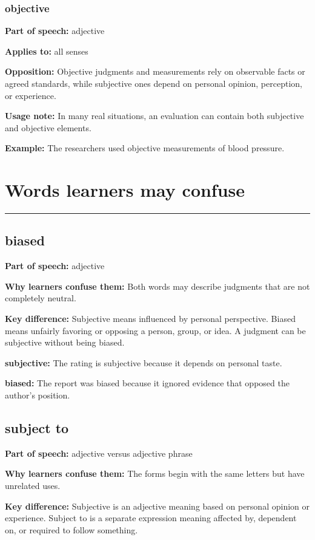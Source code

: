 \documentclass[11pt]{article}
\newcommand{\sectionrule}{\par\vspace{-0.5em}\noindent\textcolor{Accent}{\rule{\linewidth}{0.6pt}}\par}
\begin{document}
\subsubsection{objective}
\textbf{Part of speech:} adjective

\textbf{Applies to:} all senses

\textbf{Opposition:} Objective judgments and measurements rely on observable facts or agreed standards, while subjective ones depend on personal opinion, perception, or experience.

\textbf{Usage note:} In many real situations, an evaluation can contain both subjective and objective elements.

\textbf{Example:} The researchers used objective measurements of blood pressure.

\section{Words learners may confuse}
\sectionrule
\subsection{biased}
\textbf{Part of speech:} adjective

\textbf{Why learners confuse them:} Both words may describe judgments that are not completely neutral.

\textbf{Key difference:} Subjective means influenced by personal perspective. Biased means unfairly favoring or opposing a person, group, or idea. A judgment can be subjective without being biased.

\textbf{subjective:} The rating is subjective because it depends on personal taste.

\textbf{biased:} The report was biased because it ignored evidence that opposed the author's position.

\subsection{subject to}
\textbf{Part of speech:} adjective versus adjective phrase

\textbf{Why learners confuse them:} The forms begin with the same letters but have unrelated uses.

\textbf{Key difference:} Subjective is an adjective meaning based on personal opinion or experience. Subject to is a separate expression meaning affected by, dependent on, or required to follow something.
\end{document}
